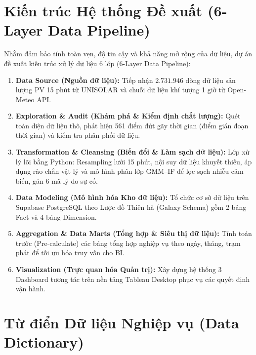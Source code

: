 \documentclass[12pt, a4paper]{report}
\begin{document}
\section{Kiến trúc Hệ thống Đề xuất (6-Layer Data Pipeline)}
\label{sec:kientruc_dexuat}

Nhằm đảm bảo tính toàn vẹn, độ tin cậy và khả năng mở rộng của dữ liệu, dự án đề xuất kiến trúc xử lý dữ liệu 6 lớp (6-Layer Data Pipeline):

\begin{enumerate}[label=\textbf{Layer \arabic* --}, leftmargin=*]
    \item \textbf{Data Source (Nguồn dữ liệu):} Tiếp nhận $2.731.946$ dòng dữ liệu sản lượng PV 15 phút từ UNISOLAR và chuỗi dữ liệu khí tượng 1 giờ từ Open-Meteo API.
    \item \textbf{Exploration \& Audit (Khám phá \& Kiểm định chất lượng):} Quét toàn diện dữ liệu thô, phát hiện 561 điểm đứt gãy thời gian (điểm gián đoạn thời gian) và kiểm tra phân phối dữ liệu.
    \item \textbf{Transformation \& Cleansing (Biến đổi \& Làm sạch dữ liệu):} Lớp xử lý lõi bằng Python: Resampling lưới 15 phút, nội suy dữ liệu khuyết thiếu, áp dụng rào chắn vật lý và mô hình phân lớp GMM--IF để lọc sạch nhiễu cảm biến, gán 6 mã lý do sự cố.
    \item \textbf{Data Modeling (Mô hình hóa Kho dữ liệu):} Tổ chức cơ sở dữ liệu trên Supabase PostgreSQL theo Lược đồ Thiên hà (Galaxy Schema) gồm 2 bảng Fact và 4 bảng Dimension.
    \item \textbf{Aggregation \& Data Marts (Tổng hợp \& Siêu thị dữ liệu):} Tính toán trước (Pre-calculate) các bảng tổng hợp nghiệp vụ theo ngày, tháng, trạm phát để tối ưu hóa truy vấn cho BI.
    \item \textbf{Visualization (Trực quan hóa Quản trị):} Xây dựng hệ thống 3 Dashboard tương tác trên nền tảng Tableau Desktop phục vụ các quyết định vận hành.
\end{enumerate}

\section{Từ điển Dữ liệu Nghiệp vụ (Data Dictionary)}
\label{sec:tudien_dulieu}
\end{document}
